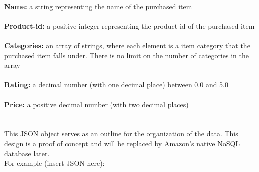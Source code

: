 \documentclass[12pt,a4paper]{article}
\begin{document}
		\\
		\textbf{Name:}  a string representing the name of the purchased item \\
		\\
		\textbf{Product-id:} a positive integer representing the product id of the 
		purchased item\\
		\\
		\textbf{Categories:} an array of strings, where each element is a item category that the purchased item falls under. There is no limit on the number of categories in the array\\
		\\
		\textbf{Rating:} a decimal number (with one decimal place) between 0.0 and 5.0\\
		\\
		\textbf{Price:} a positive decimal number (with two decimal places)\\
		\\\\
		This JSON object serves as an outline for the organization of the data. This design is a proof of concept and will be replaced by Amazon's native NoSQL database later.  \\
		
		For example (insert JSON here):
		\inputminted{json}{knowledge-representation.json}
		
\end{document}
